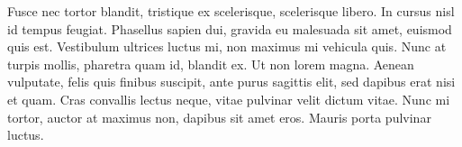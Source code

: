 \documentclass{ideathon2026}
\begin{document}
Fusce nec tortor blandit, tristique ex scelerisque, scelerisque libero. In cursus nisl id tempus feugiat. Phasellus sapien dui, gravida eu malesuada sit amet, euismod quis est. Vestibulum ultrices luctus mi, non maximus mi vehicula quis. Nunc at turpis mollis, pharetra quam id, blandit ex. Ut non lorem magna. Aenean vulputate, felis quis finibus suscipit, ante purus sagittis elit, sed dapibus erat nisi et quam. Cras convallis lectus neque, vitae pulvinar velit dictum vitae. Nunc mi tortor, auctor at maximus non, dapibus sit amet eros. Mauris porta pulvinar luctus.
\end{document}
